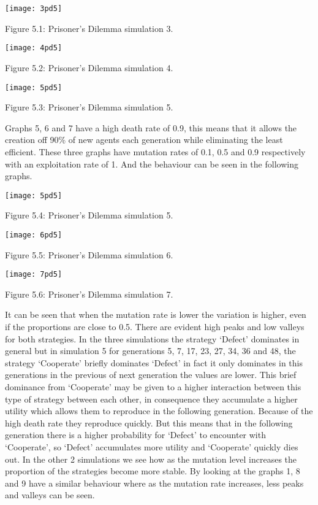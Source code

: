 \documentclass{article}
\begin{document}
\begin{center}
	\texttt{[image: 3pd5]}
	
Figure 5.1: Prisoner's Dilemma simulation 3.
	
	\texttt{[image: 4pd5]}
	
Figure 5.2: Prisoner's Dilemma simulation 4.

	\texttt{[image: 5pd5]}

Figure 5.3: Prisoner's Dilemma simulation 5.
\end{center}
Graphs 5, 6 and 7  have a high death rate of 0.9, this means that it allows the creation off 90\% of new agents each generation while eliminating the least efficient. These three graphs have mutation rates of 0.1, 0.5 and 0.9 respectively with an exploitation rate of 1. And the behaviour can be seen in the following graphs.
\begin{center}
	\texttt{[image: 5pd5]}
	
Figure 5.4: Prisoner's Dilemma simulation 5.
	
	\texttt{[image: 6pd5]}
	
Figure 5.5: Prisoner's Dilemma simulation 6.

	\texttt{[image: 7pd5]}

Figure 5.6: Prisoner's Dilemma simulation 7.
\end{center}
It can be seen that when the mutation rate is lower the variation is higher, even if the proportions are close to 0.5. There are evident high peaks and low valleys  for both strategies. In the three simulations the strategy `Defect' dominates in general but in simulation 5  for generations 5, 7, 17, 23, 27, 34, 36 and 48, the strategy `Cooperate' briefly dominates `Defect' in fact it only dominates in this generations in the previous of next generation the values are lower. This brief dominance from `Cooperate' may be given to a higher interaction between this type of strategy between each other, in consequence they accumulate a higher utility which allows them to reproduce in the following generation. Because of the high death rate they reproduce quickly. But this means that in the following generation there is a higher probability for `Defect' to encounter with `Cooperate', so `Defect' accumulates more utility and  `Cooperate' quickly dies out. In the other 2 simulations we see how as the mutation level increases the proportion of the strategies become more stable. By looking at the graphs 1, 8 and 9 have a similar behaviour where as the mutation rate increases, less peaks and valleys can be seen.
\end{document}
